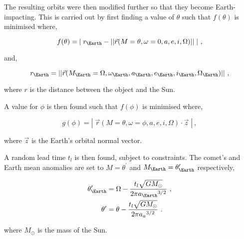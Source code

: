 The resulting orbits were then modified further so that they become Earth-impacting. This is carried out by first finding a value of $\theta$ such that $f(\theta)$ is minimised where,

\begin{equation}
    f(\theta) = | \; r_{\Earth} - ||\vec{r}(M = \theta, \omega = 0, a, e, i, \Omega)|| \; | ~,
\end{equation}

and,

\begin{equation}
   r_{\Earth} = ||\vec{r}(M_{\Earth}=\Omega, \omega_{\Earth}, a_{\Earth}, e_{\Earth}, i_{\Earth}, \Omega_{\Earth})||~,
\end{equation}

where $r$ is the distance between the object and the Sun.

A value for $\phi$ is then found such that $f(\phi)$ is minimised where,

\begin{equation}
    g(\phi) = | \; \vec{r}(M = \theta, \omega = \phi, a, e, i, \Omega) \cdot \vec{z} \; | ~,
\end{equation}

where $\vec{z}$ is the Earth's orbital normal vector.

A random lead time $t_l$ is then found, subject to constraints. The comet's and Earth mean anomalies are set to $M = \theta^{\prime}$ and $M_{\Earth} = \theta^{\prime}_{\Earth}$ respectively,

\begin{equation}
    \begin{split}
        \theta^{\prime}_{\Earth} &= \Omega - \dfrac{t_l \sqrt{GM_\odot}}{2\pi {a_{\Earth}}^{3/2}}~, \\
        \theta^{\prime} &= \theta - \dfrac{t_l \sqrt{GM_\odot}}{2\pi {a_{a}}^{3/2}}~.
    \end{split}
\end{equation}

where $M_\odot$ is the mass of the Sun.

\fi